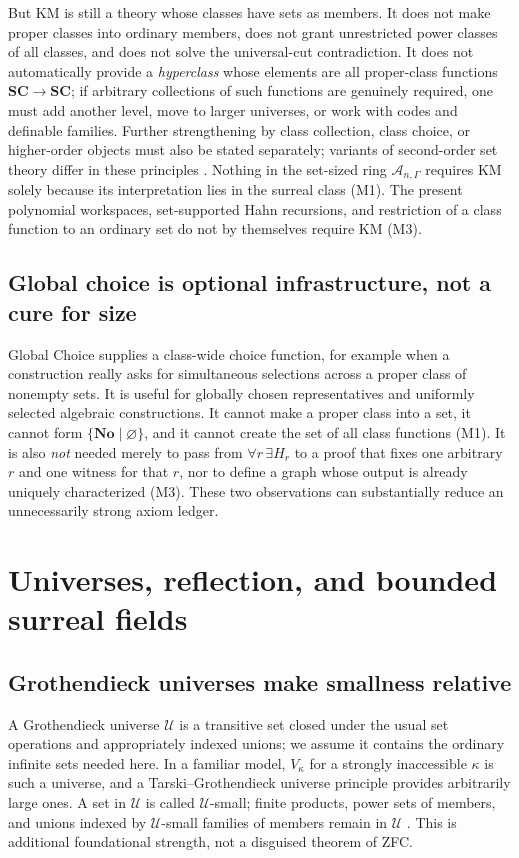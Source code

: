 \documentclass[11pt,letterpaper]{article}
\numberwithin{equation}{section}
\theoremstyle{definition}
\theoremstyle{remark}
\newcommand{\No}{\mathbf{No}}
\newcommand{\SC}{\mathbf{SC}}
\newcommand{\U}{\mathcal U}
\newcommand{\Ag}{\mathscr A}
\begin{document}
But KM is still a theory whose classes have sets as members. It does not make
proper classes into ordinary members, does not grant unrestricted power classes
of all classes, and does not solve the universal-cut contradiction. It does not
automatically provide a \emph{hyperclass} whose elements are all proper-class
functions $\SC\to\SC$; if arbitrary collections of such functions are genuinely
required, one must add another level, move to larger universes, or work with
codes and definable families. Further strengthening by class collection, class
choice, or higher-order objects must also be stated separately; variants of
second-order set theory differ in these principles \cite{found:Williams}.
Nothing in the set-sized ring $\Ag_{n,\Gamma}$ requires KM solely because its
interpretation lies in the surreal class (M1). The present polynomial
workspaces, set-supported Hahn recursions, and restriction of a class function
to an ordinary set do not by themselves require KM (M3).

\subsection{Global choice is optional infrastructure, not a cure for size}
\label{found:sub:globalchoice}
Global Choice supplies a class-wide choice function, for example when a
construction really asks for simultaneous selections across a proper class of
nonempty sets. It is useful for globally chosen representatives and uniformly
selected algebraic constructions. It cannot make a proper class into a set, it
cannot form $\{\No\mid\varnothing\}$, and it cannot create the set of all class
functions (M1). It is also \emph{not} needed merely to pass from
$\forall r\,\exists H_r$ to a proof that fixes one arbitrary $r$ and one witness
for that $r$, nor to define a graph whose output is already uniquely
characterized (M3). These two observations can substantially reduce an
unnecessarily strong axiom ledger.

\section{Universes, reflection, and bounded surreal fields}
\label{found:sec:universes}

\subsection{Grothendieck universes make smallness relative}
\label{found:sub:universes}
A Grothendieck universe $\U$ is a transitive set closed under the usual set
operations and appropriately indexed unions; we assume it contains the ordinary
infinite sets needed here. In a familiar model, $V_\kappa$ for a strongly
inaccessible $\kappa$ is such a universe, and a Tarski--Grothendieck universe
principle provides arbitrarily large ones. A set in $\U$ is called
$\U$-small; finite products, power sets of members, and unions indexed by
$\U$-small families of members remain in $\U$ \cite[\S8]{found:ShulmanSize}.
This is additional foundational strength, not a disguised theorem of ZFC.
\end{document}
